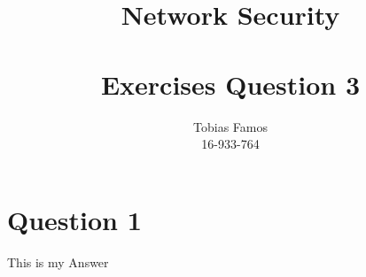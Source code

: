 \documentclass[11pt,a4paper]{article}
\title{Network Security \\ ~\\ \Large{Exercises Question 3}}
\author{Tobias Famos\\ 16-933-764}
\begin{document}
    \maketitle
    \section{Question 1}
    This is my Answer
\end{document}
